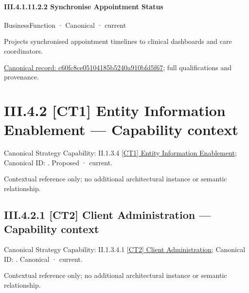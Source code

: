 \paragraph*{III.4.1.11.2.2 Synchronise Appointment Status}
\label{navigation:III.4.1.11.2.2}

\label{element:c60fc8ce05104185b5240a910bfd5f67}
{\small BusinessFunction · Canonical · current}\par

Projects synchronised appointment timelines to clinical dashboards and care coordinators.


{\footnotesize \href{../../../../continuum/business/business-function/c60fc8ce05104185b5240a910bfd5f67.md}{Canonical record: c60fc8ce05104185b5240a910bfd5f67}; full qualifications and provenance.}\par
\section*{III.4.2 [CT1] Entity Information Enablement — Capability context}
\label{navigation:III.4.2}

{\small Canonical Strategy Capability: II.1.3.4 \hyperref[element:b5a92874f8ac4509a30af5253590edc1]{[CT1] Entity Information Enablement}; Canonical ID: \texttt{}. Proposed · current.}\par
Contextual reference only; no additional architectural instance or semantic relationship.\par
\subsection*{III.4.2.1 [CT2] Client Administration — Capability context}
\label{navigation:III.4.2.1}

{\small Canonical Strategy Capability: II.1.3.4.1 \hyperref[element:f0885472cced4bccbcce1568bf0360dc]{[CT2] Client Administration}; Canonical ID: \texttt{}. Canonical · current.}\par
Contextual reference only; no additional architectural instance or semantic relationship.\par
